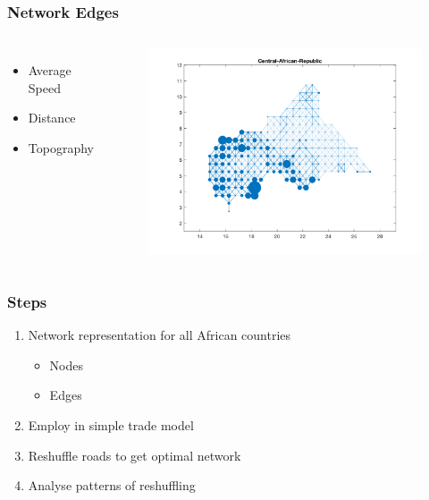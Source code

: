 \documentclass[]{beamer}   	%
\begin{document}
\begin{frame}
  \frametitle{Network Edges}
  \begin{columns}
      \begin{itemize}
        \item Average Speed
        \item Distance
        \item Topography
      \end{itemize}
  \begin{figure}
    \centering
    \includegraphics[width=\textwidth, trim={2cm 1cm 1.5cm 0cm},clip]{../../Build/output/Matlab_graphs/Nicer_graphs/Central-African-Republic_stat.png}
  \end{figure}
  \end{columns}
\end{frame}

\begin{frame}
  \frametitle{Steps}
  \begin{enumerate}
    \item Network representation for all African countries
    \begin{itemize}
      \item Nodes
      \item Edges
    \end{itemize}
    \item \alert{Employ in simple trade model}
    \item Reshuffle roads to get optimal network
    \item Analyse patterns of reshuffling
  \end{enumerate}
\end{frame}
\end{document}

